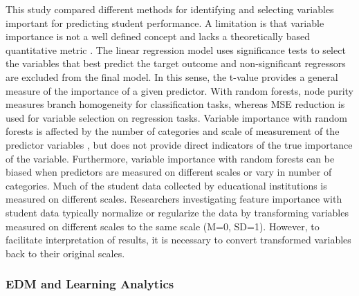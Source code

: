 \documentclass[sigconf]{acmart}
\begin{document}
This study compared different methods for identifying and selecting variables 
important for predicting student performance. A limitation is that variable 
importance is not a well defined concept and lacks a theoretically based 
quantitative metric \cite{gromping09}. The linear regression model uses 
significance tests to select the variables that best predict the target outcome 
and non-significant regressors are excluded from the final model. In this sense,
the t-value provides a general measure of the importance of a given predictor. 
With random forests, node purity measures branch homogeneity for classification 
tasks, whereas MSE reduction is used for variable selection on regression tasks. 
Variable importance with random forests is affected by the number of categories
and scale of measurement of the predictor variables \cite{strobl07}, but does 
not provide direct indicators of the true importance of the variable. 
Furthermore, variable importance with random forests can be biased when 
predictors are measured on different scales or vary in number of categories. 
Much of the student data collected by educational institutions is measured on 
different scales. Researchers investigating feature importance with student data 
typically normalize or regularize the data by transforming variables measured 
on different scales to the same scale (M=0, SD=1). However, to facilitate 
interpretation of results, it is necessary to convert transformed variables 
back to their original scales. 


\subsubsection{EDM and Learning Analytics}
\end{document}
